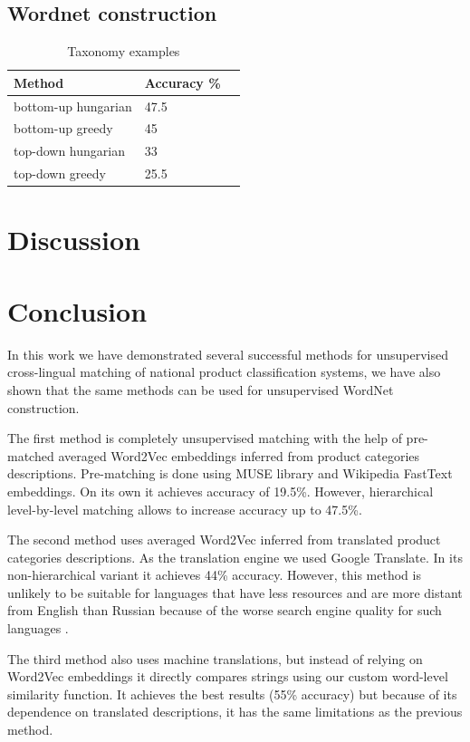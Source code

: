\documentclass[11pt,a4paper]{article}
\begin{document}
\subsection{Wordnet construction}
	\begin{table}[!htbp]
	\small
	\caption{Taxonomy examples}
	\label{table-taxonomies-results}		
	\centering
	\begin{tabular}{|l|l|l|}
		\hline
		{Method} & {Accuracy \%} \\ \hline
		bottom-up hungarian & 47.5 \\ \hline
		bottom-up greedy & 45 \\ \hline
		top-down hungarian & 33 \\ \hline
		top-down greedy & 25.5 \\
		\hline
	\end{tabular}
\end{table}
\section{Discussion}

\section{Conclusion}
In this work we have demonstrated several successful methods for unsupervised cross-lingual matching of national product classification systems, we have also shown that the same methods can be used for unsupervised WordNet construction.

The first method is completely unsupervised matching with the help of pre-matched averaged Word2Vec embeddings inferred from product categories descriptions. Pre-matching is done using MUSE library and Wikipedia FastText embeddings. On its own it achieves accuracy of 19.5\%. However, hierarchical level-by-level matching allows to increase accuracy up to 47.5\%.

The second method uses averaged Word2Vec inferred from translated product categories descriptions. As the translation engine we used Google Translate. In its non-hierarchical variant it achieves 44\% accuracy. However, this method is unlikely to be suitable for languages that have less resources and are more distant from English than Russian because of the worse search engine quality for such languages \cite{google-translate-rare}.

The third method also uses machine translations, but instead of relying on Word2Vec embeddings it directly compares strings using our custom word-level similarity function. It achieves the best results (55\% accuracy) but because of its dependence on translated descriptions, it has the same limitations as the previous method.
\end{document}
